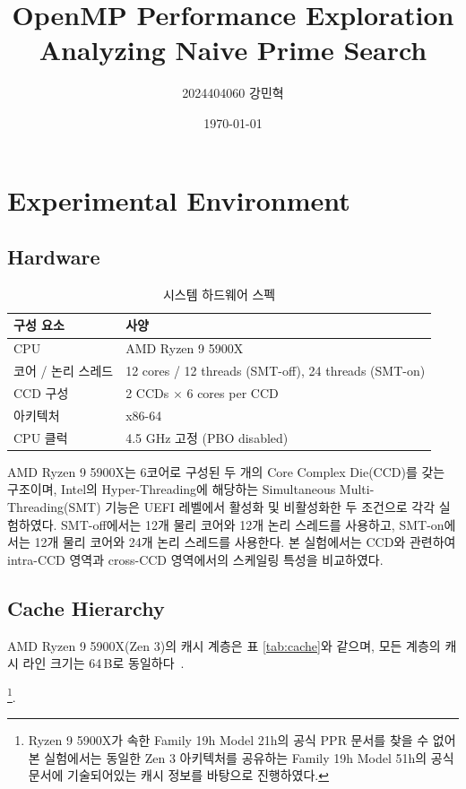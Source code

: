 \documentclass[11pt,a4paper]{article}
\title{OpenMP Performance Exploration\\Analyzing Naive Prime Search}
\author{2024404060 강민혁}
\date{\today}
\begin{document}
\maketitle

\section{Experimental Environment}

\subsection{Hardware}

\begin{table}[h]
\centering
\begin{tabular}{ll}
\toprule
구성 요소 & 사양 \\
\midrule
CPU & AMD Ryzen 9 5900X \\
코어 / 논리 스레드 & 12 cores / 12 threads (SMT-off), 24 threads (SMT-on) \\
CCD 구성 & 2 CCDs $\times$ 6 cores per CCD \\
아키텍처 & x86-64 \\
CPU 클럭 & 4.5 GHz 고정 (PBO disabled) \\
\bottomrule
\end{tabular}
\caption{시스템 하드웨어 스펙}
\end{table}

AMD Ryzen 9 5900X는 6코어로 구성된 두 개의 Core Complex Die(CCD)를 갖는 구조이며, Intel의 Hyper-Threading에 해당하는 Simultaneous Multi-Threading(SMT) 기능은 UEFI 레벨에서 활성화 및 비활성화한 두 조건으로 각각 실험하였다. SMT-off에서는 12개 물리 코어와 12개 논리 스레드를 사용하고, SMT-on에서는 12개 물리 코어와 24개 논리 스레드를 사용한다. 본 실험에서는 CCD와 관련하여 intra-CCD 영역과 cross-CCD 영역에서의 스케일링 특성을 비교하였다.

\subsection{Cache Hierarchy}

AMD Ryzen 9 5900X(Zen 3)의 캐시 계층은 표 \ref{tab:cache}와 같으며, 모든 계층의 캐시 라인 크기는 64\,B로 동일하다~\cite{amd-ppr-family19h}. 

\footnote{Ryzen 9 5900X가 속한 Family 19h Model 21h의 공식 PPR 문서를 찾을 수 없어 본 실험에서는 동일한 Zen 3 아키텍처를 공유하는 Family 19h Model 51h의 공식 문서에 기술되어있는 캐시 정보를 바탕으로 진행하였다.}.
\end{document}
